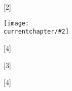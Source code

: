 \newcommand{\currentchapter}{}
\newcommand\image[2]{%
  \begin{figure}[H]%
    \centering%
    \texttt{[image: \\currentchapter/\#2]}%
  \end{figure}%
}
\WithSuffix\newcommand\image*[2]{%
  \begin{figure*}%
    \centering%
    \texttt{[image: \\currentchapter/\#2]}%
  \end{figure*}%
}
\newcommand{\fig}[5][t]{%
  \begin{figure}[#1]%
    \centering%
    \texttt{[image: \\currentchapter/\#3]}%
    \caption{#4}\label{#5}%
  \end{figure}%
}
\WithSuffix\newcommand\fig*[4]{%
}
\newcommand\tbl[3]{%
  \begin{table}[H]%
    \centering%
    \caption{#2}\label{#3}%
  \end{table}%
}
\WithSuffix\newcommand\tbl*[3]{%
}
\newcommand\tikzfig[5][t]{%
  \begin{figure}[#1]%
    \centering%
    \resizebox{#2\linewidth}{!}{}%
    \caption{#4}\label{#5}%
  \end{figure}%
}
\WithSuffix\newcommand\tikzfig*[4]{%
}

\newcommand{\newchapter}[1]{%
	\renewcommand{\currentchapter}{#1}
	
}

\newcommand{\matlab}{\textsc{Matlab}}
\newcommand{\email}[1]{\href{mailto:#1}{#1}}

\renewcommand{\algorithmicrequire}{\textbf{Input:}}
\renewcommand{\algorithmicensure}{\textbf{Output:}}

\DeclareMathOperator*{\argmin}{arg\,min}
\DeclareMathOperator*{\argmax}{arg\,max}
\newcommand{\enumber}[2]{{#1}\mathrm{e}{#2}}

\newcommand\blfootnote[1]{%
  \begingroup
  \renewcommand\thefootnote{}\footnote{#1}%
  \addtocounter{footnote}{-1}%
  \endgroup
}
